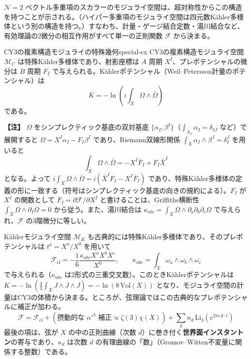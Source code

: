 \documentclass[uplatex, dvipdfmx, book]{jsbook}
\newenvironment{note}{\vspace{1ex}\par\footnotesize\noindent\textbf{【注】}}{\par\vspace{1ex}}
\begin{document}
$\mathcal{N} = 2$ ベクトル多重項のスカラーのモジュライ空間は、超対称性からこの構造を持つことが示される。（ハイパー多重項のモジュライ空間は四元数K\"ahler多様体という別の構造を持つ。）すなわち、計量・ゲージ結合定数・湯川結合など、有効理論の2微分の相互作用がすべて単一の正則関数 $\mathcal{F}$ から決まる。

\begin{myprop}{CY3の複素構造モジュライの特殊幾何}{special-cx}
CY3の複素構造モジュライ空間 $\mathcal{M}_C$ は特殊K\"ahler多様体であり、射影座標は $A$ 周期 $X^I$、プレポテンシャルの微分は $B$ 周期 $F_I$ で与えられる。K\"ahlerポテンシャル（Weil--Petersson計量のポテンシャル）は
\begin{equation*}
    K = -\ln\left( i\int_X \Omega \wedge \bar{\Omega} \right)
\end{equation*}
である。
\end{myprop}

\begin{note}
$\Omega$ をシンプレクティック基底の双対基底 $\{\alpha_I, \beta^I\}$（$\int_{A_J}\alpha_I = \delta_{IJ}$ など）で展開すると $\Omega = X^I\alpha_I - F_I\beta^I$ であり、Riemann双線形関係 $\int_X \alpha_I \wedge \beta^J = \delta_I^J$ を用いると
\begin{equation*}
    \int_X \Omega \wedge \bar\Omega = -X^I\bar{F}_I + F_I\bar{X}^I
\end{equation*}
となる。よって $i\int_X\Omega\wedge\bar\Omega = i(\bar X^IF_I - X^I\bar F_I)$ であり、特殊K\"ahler多様体の定義の形に一致する（符号はシンプレクティック基底の向きの規約による）。$F_I$ が $X^I$ の関数として $F_I = \partial\mathcal{F}/\partial X^I$ と書けることは、Griffiths横断性 $\int_X \Omega \wedge \partial_I\Omega = 0$ から従う。また、湯川結合は $\kappa_{abc} = \int_X \Omega \wedge \partial_a\partial_b\partial_c\Omega$ で与えられ、$\mathcal{F}$ の3階微分に等しい。
\end{note}

K\"ahlerモジュライ空間 $\mathcal{M}_K$ も古典的には特殊K\"ahler多様体であり、そのプレポテンシャルは $t^a = X^a/X^0$ を用いて
\begin{equation}
    \mathcal{F}_{\text{cl}} = -\frac{1}{6}\frac{\kappa_{abc}X^aX^bX^c}{X^0}, \qquad \kappa_{abc} = \int_X \omega_a \wedge \omega_b \wedge \omega_c
\end{equation}
で与えられる（$\kappa_{abc}$ は2形式の三重交叉数）。このときK\"ahlerポテンシャルは $K = -\ln\left(\frac{4}{3}\int_X J\wedge J\wedge J\right) = -\ln(8\,\mathrm{Vol}(X))$ となり、モジュライ空間の計量はCY3の体積から決まる。ところが、弦理論ではこの古典的なプレポテンシャルに補正が加わる。
\begin{equation}
    \mathcal{F} = \mathcal{F}_{\text{cl}} + (\text{摂動的な } \alpha'^3 \text{ 補正} \propto \zeta(3)\chi(X)) + \sum_{d} n_d\, \mathrm{Li}_3\!\left(e^{2\pi i\, d \cdot t}\right)
\end{equation}
最後の項は、弦が $X$ の中の正則曲線（次数 $d$）に巻き付く\textbf{世界面インスタントン}の寄与であり、$n_d$ は次数 $d$ の有理曲線の「数」（Gromov--Witten不変量に関係する整数）である。
\end{document}
